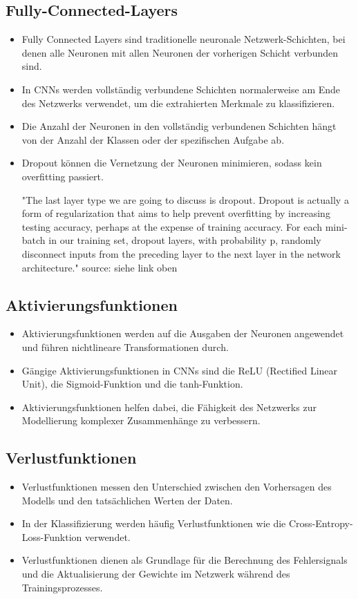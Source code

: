 \subsection{Fully-Connected-Layers}
\begin{itemize}
  \item Fully Connected Layers sind traditionelle neuronale Netzwerk-Schichten, bei denen alle Neuronen mit allen Neuronen der vorherigen Schicht verbunden sind.
  \item In CNNs werden vollständig verbundene Schichten normalerweise am Ende des Netzwerks verwendet, um die extrahierten Merkmale zu klassifizieren.
  \item Die Anzahl der Neuronen in den vollständig verbundenen Schichten hängt von der Anzahl der Klassen oder der spezifischen Aufgabe ab.
  \item Dropout können die Vernetzung der Neuronen minimieren, sodass kein overfitting passiert.

  "The last layer type we are going to discuss is dropout. Dropout is actually a form of regularization that aims to help prevent overfitting by increasing testing accuracy, perhaps at the expense of training accuracy. For each mini-batch in our training set, dropout layers, with probability p, randomly disconnect inputs from the preceding layer to the next layer in the network architecture." source: siehe link oben
\end{itemize}

\subsection{Aktivierungsfunktionen}
\begin{itemize}
  \item Aktivierungsfunktionen werden auf die Ausgaben der Neuronen angewendet und führen nichtlineare Transformationen durch.
  \item Gängige Aktivierungsfunktionen in CNNs sind die ReLU (Rectified Linear Unit), die Sigmoid-Funktion und die tanh-Funktion.
  \item Aktivierungsfunktionen helfen dabei, die Fähigkeit des Netzwerks zur Modellierung komplexer Zusammenhänge zu verbessern.
\end{itemize}

\subsection{Verlustfunktionen}
\begin{itemize}
  \item Verlustfunktionen messen den Unterschied zwischen den Vorhersagen des Modells und den tatsächlichen Werten der Daten.
  \item In der Klassifizierung werden häufig Verlustfunktionen wie die Cross-Entropy-Loss-Funktion verwendet.
  \item Verlustfunktionen dienen als Grundlage für die Berechnung des Fehlersignals und die Aktualisierung der Gewichte im Netzwerk während des Trainingsprozesses.
\end{itemize}

